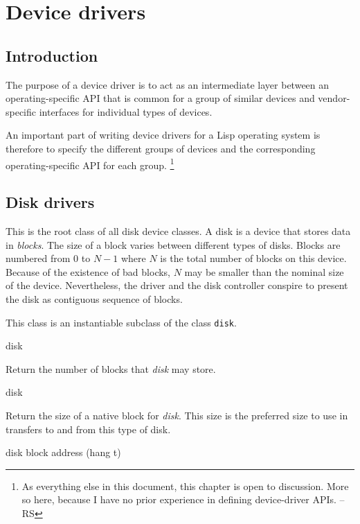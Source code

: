 \chapter{Device drivers}

\section{Introduction}

The purpose of a device driver is to act as an intermediate layer
between an operating-specific API that is common for a group of
similar devices and vendor-specific interfaces for individual types of
devices. 

An important part of writing device drivers for a Lisp operating
system is therefore to specify the different groups of devices and the
corresponding operating-specific API for each group.%
\footnote{As everything else in this document, this chapter is open to
  discussion.  More so here, because I have no prior experience in
  defining device-driver APIs. -- RS}

\section{Disk drivers}


This is the root class of all disk device classes.  A disk is a device
that stores data in \emph{blocks}.  The size of a block varies between
different types of disks.  Blocks are numbered from $0$ to $N-1$ where
$N$ is the total number of blocks on this device.  Because of the
existence of bad blocks, $N$ may be smaller than the nominal size of
the device.  Nevertheless, the driver and the disk controller conspire
to present the disk as contiguous sequence of blocks. 


This class is an instantiable subclass of the class \texttt{disk}. 

 {disk}

Return the number of blocks that \textit{disk} may store.

 {disk}

Return the size of a native block for \textit{disk}.  This size is the
preferred size to use in transfers to and from this type of disk.

 {disk block address \key (hang t)}

